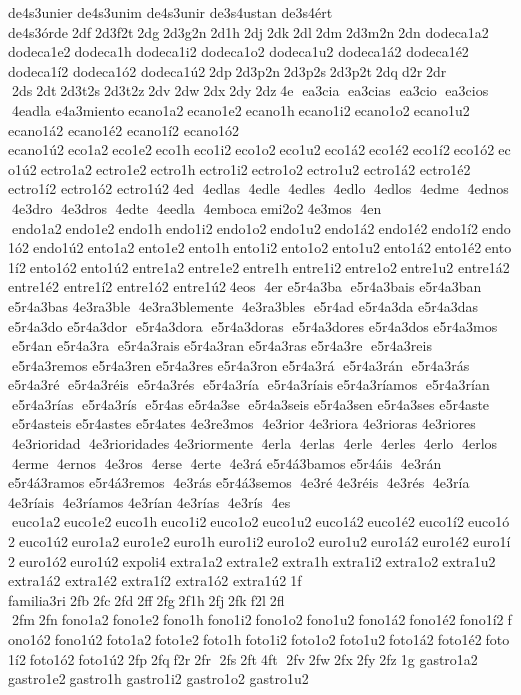 de4s3unier 	de4s3unim 	de4s3unir 
de3s4ustan 	de3s4ért 
de4s3órde 2df 2d3f2t 2dg 2d3g2n 2d1h 2dj 2dk 2dl 2dm 2d3m2n 2dn 	dodeca1a2 	dodeca1e2 dodeca1h 	dodeca1i2 	dodeca1o2 	dodeca1u2 
dodeca1á2 
dodeca1é2 
dodeca1í2 
dodeca1ó2 
dodeca1ú2 2dp 2d3p2n 2d3p2s 2d3p2t 2dq d2r 2dr  2ds 2dt 2d3t2s 2d3t2z 2dv 2dw 2dx 2dy 2dz 4e  ea3cia  ea3cias  ea3cio  ea3cios  4eadla  
e4a3miento ecano1a2 ecano1e2 ecano1h ecano1i2 ecano1o2 ecano1u2 	ecano1á2 	ecano1é2 	ecano1í2 	ecano1ó2 	ecano1ú2 eco1a2 eco1e2 eco1h eco1i2 eco1o2 eco1u2 eco1á2 eco1é2 eco1í2 eco1ó2 eco1ú2 ectro1a2 ectro1e2 ectro1h ectro1i2 ectro1o2 ectro1u2 	ectro1á2 	ectro1é2 	ectro1í2 	ectro1ó2 	ectro1ú2 4ed  4edlas  4edle  4edles  4edlo  4edlos  4edme  4ednos  4e3dro  4e3dros  4edte  4eedla  4emboca emi2o2 4e3mos  4en  endo1a2 endo1e2 endo1h endo1i2 endo1o2 endo1u2 endo1á2 endo1é2 endo1í2 endo1ó2 endo1ú2 ento1a2 ento1e2 ento1h ento1i2 ento1o2 ento1u2 ento1á2 ento1é2 ento1í2 ento1ó2 ento1ú2 entre1a2 entre1e2 entre1h entre1i2 entre1o2 entre1u2 	entre1á2 	entre1é2 	entre1í2 	entre1ó2 	entre1ú2 4eos  4er  	e5r4a3ba  e5r4a3bais  
e5r4a3ban  
e5r4a3bas  
4e3ra3ble  4e3ra3blemente  4e3ra3bles  e5r4ad  	e5r4a3da  
e5r4a3das  	e5r4a3do  
e5r4a3dor  e5r4a3dora  e5r4a3doras  e5r4a3dores  
e5r4a3dos  
e5r4a3mos  e5r4an  	e5r4a3ra  e5r4a3rais  
e5r4a3ran  
e5r4a3ras  	e5r4a3re  e5r4a3reis  e5r4a3remos  
e5r4a3ren  
e5r4a3res  
e5r4a3ron  
e5r4a3rá  e5r4a3rán  e5r4a3rás  
e5r4a3ré  e5r4a3réis  e5r4a3rés  e5r4a3ría  e5r4a3ríais e5r4a3ríamos  e5r4a3rían  e5r4a3rías  e5r4a3rís  e5r4as  	e5r4a3se  e5r4a3seis  
e5r4a3sen  
e5r4a3ses  	e5r4aste  e5r4asteis  
e5r4astes  	e5r4ates  
4e3re3mos  4e3rior  	4e3riora  
4e3rioras  
4e3riores  4e3rioridad  4e3rioridades  
4e3riormente  4erla  4erlas  4erle  4erles  4erlo  4erlos  4erme  4ernos  4e3ros  4erse  4erte  4e3rá  
e5r4á3bamos  	e5r4áis  4e3rán  
e5r4á3ramos  
e5r4á3remos  4e3rás  
e5r4á3semos  4e3ré  	4e3réis  4e3rés  4e3ría  
4e3ríais  4e3ríamos  	4e3rían  	4e3rías  4e3rís  4es  euco1a2 euco1e2 euco1h euco1i2 euco1o2 euco1u2 euco1á2 euco1é2 euco1í2 euco1ó2 euco1ú2 euro1a2 euro1e2 euro1h euro1i2 euro1o2 euro1u2 euro1á2 euro1é2 euro1í2 euro1ó2 euro1ú2 expoli4 extra1a2 extra1e2 extra1h extra1i2 extra1o2 extra1u2 	extra1á2 	extra1é2 	extra1í2 	extra1ó2 	extra1ú2 1f 
familia3ri 2fb 2fc 2fd 2ff 2fg 2f1h 2fj 2fk f2l 2fl  2fm 2fn fono1a2 fono1e2 fono1h fono1i2 fono1o2 fono1u2 fono1á2 fono1é2 fono1í2 fono1ó2 fono1ú2 foto1a2 foto1e2 foto1h foto1i2 foto1o2 foto1u2 foto1á2 foto1é2 foto1í2 foto1ó2 foto1ú2 2fp 2fq f2r 2fr  2fs 2ft 4ft  2fv 2fw 2fx 2fy 2fz 1g 	gastro1a2 	gastro1e2 gastro1h 	gastro1i2 	gastro1o2 	gastro1u2 
